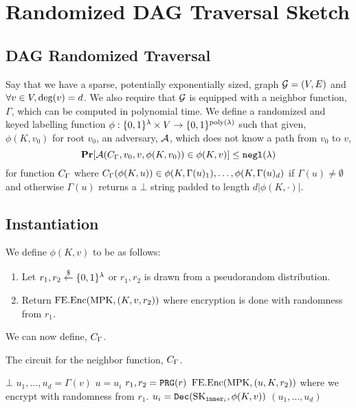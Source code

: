 \section{Randomized DAG Traversal Sketch}
\newcommand{\labelFunc}{\phi}
\newcommand{\imageFn}{\text{Image}}
\newcommand{\pathSuffix}{\text{Suff}}

\subsection{DAG Randomized Traversal}
Say that we have a sparse, potentially exponentially sized, graph $\mathcal{G} = (V, E)$
and $\forall v \in V, \deg(v) = d$.
We also require that $\mathcal{G}$ is equipped with a neighbor function, $\Gamma$, which can be computed in polynomial time.
We define a randomized and keyed labelling function $\phi: \{0,1\}^\lambda \times V \rightarrow \{0,1\}^{\operatorname{poly}(\lambda)}$ 
such that given, $\phi(K, v_0)$ for root $v_0$, an adversary, $\mathcal{A}$, which does not know a path from $v_0$ to $v$,
\begin{equation}
	\label{eq:guessPhi}
	\Pr[\advers(\circNeigb, v_0, v, \labelFunc(K, v_0)) \in \labelFunc(K, v)] \leq \negl(\lambda)
\end{equation}
for function $C_\Gamma$ where $\circNeigb(\labelFunc(K, u)) \in \labelFunc(K, \Gamma(u)_1), \dots, \labelFunc(K, \Gamma(u)_d)$
if $\Gamma(u) \neq \emptyset$ and otherwise $\Gamma(u)$ returns a $\bot$ string padded to length $d |\labelFunc(K, \cdot)|$.

\subsection{Instantiation}
We define $\labelFunc(K, v)$ to be as follows:
\begin{enumerate}
	\item Let $r_1, r_2 \overset{\$}{\gets} \{0,1\}^\lambda$ or $r_1, r_2$ is drawn from a pseudorandom distribution. %
	\item Return $\text{FE.Enc}(\text{MPK}, (K, v, r_2))$ where encryption is done with randomness from $r_1$.
\end{enumerate}

We can now define, $C_\Gamma$.
\begin{algorithm}[H]
	\caption{
		The circuit for the neighbor function, $C_\Gamma$.
	}
	\begin{algorithmic}[1]
				\State \Return $\bot$
			\EndIf
			\State $u_1, \dots, u_d = \Gamma(v)$
			\State $u = u_i$
			\State $r_1, r_2 = \texttt{PRG}(r)$
			\label{alg:neighb:prg}
			\State \Return $\text{FE.Enc}(\text{MPK}, (u, K, r_2))$ where we encrypt with randomness from $r_1$.
		\EndFunction
				\State $u_i = \texttt{Dec}(\text{SK}_{\texttt{inner}_i}, \phi(K, v))$
			\EndFor
			\State \Return $(u_1, \dots, u_d)$
		\EndFunction
	\end{algorithmic}
	\label{alg:neighb}
\end{algorithm}

